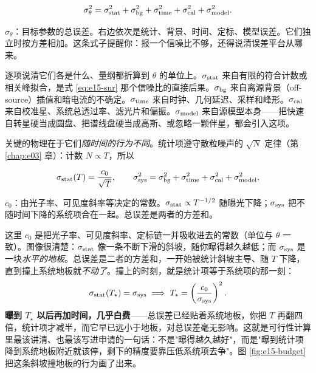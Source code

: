 \begin{equation}
  \sigma_\theta^2
  = \sigma_{\rm stat}^2
  + \sigma_{\rm bg}^2
  + \sigma_{\rm time}^2
  + \sigma_{\rm cal}^2
  + \sigma_{\rm model}^2 .
  \label{eq:e15-error-budget}
\end{equation}
\begin{formulaexplain}
\(\sigma_\theta\)：目标参数的总误差。右边依次是统计、背景、时间、定标、模型误差。它们独立时按方差相加。这条式子提醒你：报一个信噪比不够，还得说清误差平台从哪来。
\end{formulaexplain}

逐项说清它们各是什么、量纲都折算到 \(\theta\) 的单位上。\(\sigma_{\rm stat}\) 来自有限的符合计数或相关峰拟合，是式 \eqref{eq:e15-snr} 那个信噪比的直接后果。\(\sigma_{\rm bg}\) 来自离源背景（off-source）插值和暗电流的不确定。\(\sigma_{\rm time}\) 来自时钟、几何延迟、采样和峰形。\(\sigma_{\rm cal}\) 来自校准星、系统总透过率、滤光片和偏振。\(\sigma_{\rm model}\) 来自源模型本身——把快速自转星硬当成圆盘、把谱线盘硬当成高斯、或忽略一颗伴星，都会引入这项。

关键的物理在于它们\emph{随时间的行为不同}。统计项遵守散粒噪声的 \(\sqrt N\) 定律（第 \ref{chap:e03} 章）：计数 \(N\propto T\)，所以

\begin{equation}
  \sigma_{\rm stat}(T)=\frac{c_0}{\sqrt{T}} ,
  \qquad
  \sigma_{\rm sys}^2=\sigma_{\rm bg}^2+\sigma_{\rm time}^2
        +\sigma_{\rm cal}^2+\sigma_{\rm model}^2 ,
  \label{eq:e15-floor}
\end{equation}
\begin{formulaexplain}
\(c_0\)：由光子率、可见度斜率等决定的常数。\(\sigma_{\rm stat}\propto T^{-1/2}\) 随曝光下降；\(\sigma_{\rm sys}\) 把不随时间下降的系统项合在一起。总误差是两者的方差和。
\end{formulaexplain}

这里 \(c_0\) 是把光子率、可见度斜率、定标链一并吸收进去的常数（单位与 \(\theta\) 一致）。图像很清楚：\(\sigma_{\rm stat}\) 像一条不断下滑的斜坡，随你曝得越久越低；而 \(\sigma_{\rm sys}\) 是一块\emph{水平的地板}。总误差是二者的方差和，一开始被统计斜坡主导、随 \(T\) 下降，直到撞上系统地板就\emph{不动了}。撞上的时刻，就是统计项等于系统项的那一刻：
\[
  \sigma_{\rm stat}(T_\star)=\sigma_{\rm sys}
  \;\Longrightarrow\;
  T_\star=\left(\frac{c_0}{\sigma_{\rm sys}}\right)^{2}.
\]
\textbf{曝到 \(T_\star\) 以后再加时间，几乎白费}——总误差已经贴着系统地板，你把 \(T\) 再翻四倍，统计项才减半，而它早已远小于地板，对总误差毫无影响。这就是可行性计算里最该讲清、也最该写进申请的一句话：不是"曝得越久越好"，而是"曝到统计项降到系统地板附近就该停，剩下的精度要靠压低系统项去争"。图 \ref{fig:e15-budget} 把这条斜坡撞地板的行为画了出来。

